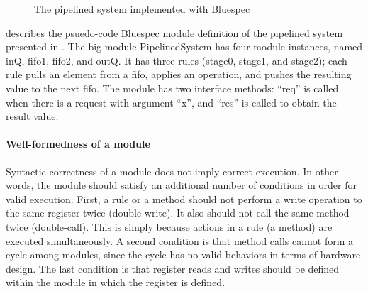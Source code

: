 \begin{figure}[t]
  \caption{The pipelined system implemented with Bluespec}
  \label{ex-pipelined-system-bluespec}
\end{figure}

 describes the psuedo-code
Bluespec module definition of the pipelined system presented in
. The big module PipelinedSystem has four
module instances, named inQ, fifo1, fifo2, and outQ. It has three
rules (stage0, stage1, and stage2); each rule pulls an element from a
fifo, applies an operation, and pushes the resulting value to the next
fifo. The module has two interface methods: ``req'' is called when
there is a request with argument ``x'', and ``res'' is called to
obtain the result value.

\paragraph{Well-formedness of a module}

Syntactic correctness of a module does not imply correct execution. In
other words, the module should satisfy an additional number of
conditions in order for valid execution. First, a rule or a method
should not perform a write operation to the same register twice
(double-write). It also should not call the same method twice
(double-call). This is simply because actions in a rule (a method) are
executed simultaneously. A second condition is that method calls
cannot form a cycle among modules, since the cycle has no valid
behaviors in terms of hardware design. The last condition is that
register reads and writes should be defined within the module in which
the register is defined.

